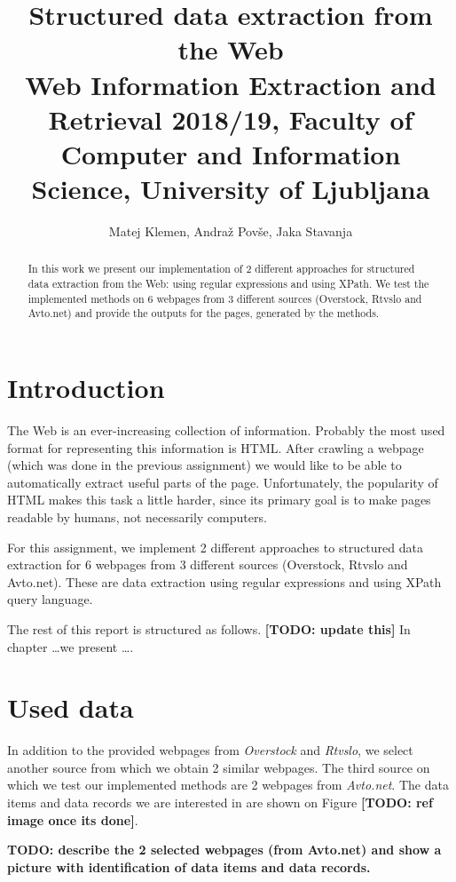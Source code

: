 \documentclass[9pt]{IEEEtran}
\title{\vspace{0ex} %
Structured data extraction from the Web
\\ \normalsize{Web Information Extraction and Retrieval 2018/19, Faculty of Computer and Information Science, University of Ljubljana}}
\author{ %
Matej Klemen, Andraž Povše, Jaka Stavanja
\vspace{-4.0ex}
}
\begin{document}
\maketitle

\begin{abstract}
In this work we present our implementation of 2 different approaches for structured data extraction from the Web: using regular expressions and using XPath.
We test the implemented methods on 6 webpages from 3 different sources (Overstock, Rtvslo and Avto.net) and provide the outputs for the pages, generated by the methods.
\end{abstract}

\section{Introduction}

The Web is an ever-increasing collection of information. 
Probably the most used format for representing this information is HTML.
After crawling a webpage (which was done in the previous assignment) we would like to be able to automatically extract useful parts of the page.
Unfortunately, the popularity of HTML makes this task a little harder, since its primary goal is to make pages readable by humans, not necessarily computers.

For this assignment, we implement 2 different approaches to structured data extraction for 6 webpages from 3 different sources (Overstock, Rtvslo and Avto.net). 
These are data extraction using regular expressions and using XPath query language.

The rest of this report is structured as follows.
\textbf{[TODO: update this]} In chapter \ldots we present \ldots.

\section{Used data}

In addition to the provided webpages from \textit{Overstock} and \textit{Rtvslo}, we select another source from which we obtain 2 similar webpages.
The third source on which we test our implemented methods are 2 webpages from \textit{Avto.net}. The data items and data records we are interested in are shown on Figure \textbf{[TODO: ref image once its done]}.

\textbf{TODO: describe the 2 selected webpages (from Avto.net) and show a picture with identification of data items and data records.}
\end{document}
